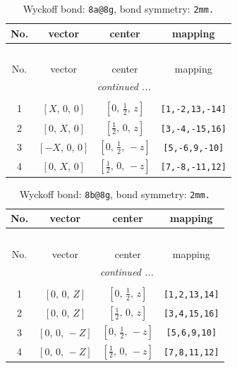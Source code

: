 \documentclass[fleqn,8pt]{jsarticle}
\begin{document}
\begin{longtable}{cccc}
\caption{Wyckoff bond: {\tt 8a@8g}, bond symmetry: {\tt 2mm.}}
 \\
 \hline \hline
No. & vector & center & mapping \\ \hline \endfirsthead

\multicolumn{3}{l}{\tablename\ \thetable{}} \\
 \hline \hline
No. & vector & center & mapping \\ \hline \endhead

 \hline \hline
\multicolumn{3}{r}{\footnotesize\it continued ...} \\ \endfoot

 \hline \hline
\multicolumn{3}{r}{} \\ \endlastfoot

1 & $\left[ X,\, 0,\, 0 \right]$ & $\left[ 0,\, \frac{1}{2},\, z \right]$ & {\tt [1,-2,13,-14]} \\ \hline
2 & $\left[ 0,\, X,\, 0 \right]$ & $\left[ \frac{1}{2},\, 0,\, z \right]$ & {\tt [3,-4,-15,16]} \\ \hline
3 & $\left[ - X,\, 0,\, 0 \right]$ & $\left[ 0,\, \frac{1}{2},\, - z \right]$ & {\tt [5,-6,9,-10]} \\ \hline
4 & $\left[ 0,\, X,\, 0 \right]$ & $\left[ \frac{1}{2},\, 0,\, - z \right]$ & {\tt [7,-8,-11,12]} \\
\end{longtable}
\renewcommand{\arraystretch}{1.2}
\begin{longtable}{cccc}
\caption{Wyckoff bond: {\tt 8b@8g}, bond symmetry: {\tt 2mm.}}
 \\
 \hline \hline
No. & vector & center & mapping \\ \hline \endfirsthead

\multicolumn{3}{l}{\tablename\ \thetable{}} \\
 \hline \hline
No. & vector & center & mapping \\ \hline \endhead

 \hline \hline
\multicolumn{3}{r}{\footnotesize\it continued ...} \\ \endfoot

 \hline \hline
\multicolumn{3}{r}{} \\ \endlastfoot

1 & $\left[ 0,\, 0,\, Z \right]$ & $\left[ 0,\, \frac{1}{2},\, z \right]$ & {\tt [1,2,13,14]} \\ \hline
2 & $\left[ 0,\, 0,\, Z \right]$ & $\left[ \frac{1}{2},\, 0,\, z \right]$ & {\tt [3,4,15,16]} \\ \hline
3 & $\left[ 0,\, 0,\, - Z \right]$ & $\left[ 0,\, \frac{1}{2},\, - z \right]$ & {\tt [5,6,9,10]} \\ \hline
4 & $\left[ 0,\, 0,\, - Z \right]$ & $\left[ \frac{1}{2},\, 0,\, - z \right]$ & {\tt [7,8,11,12]} \\
\end{longtable}
\end{document}
